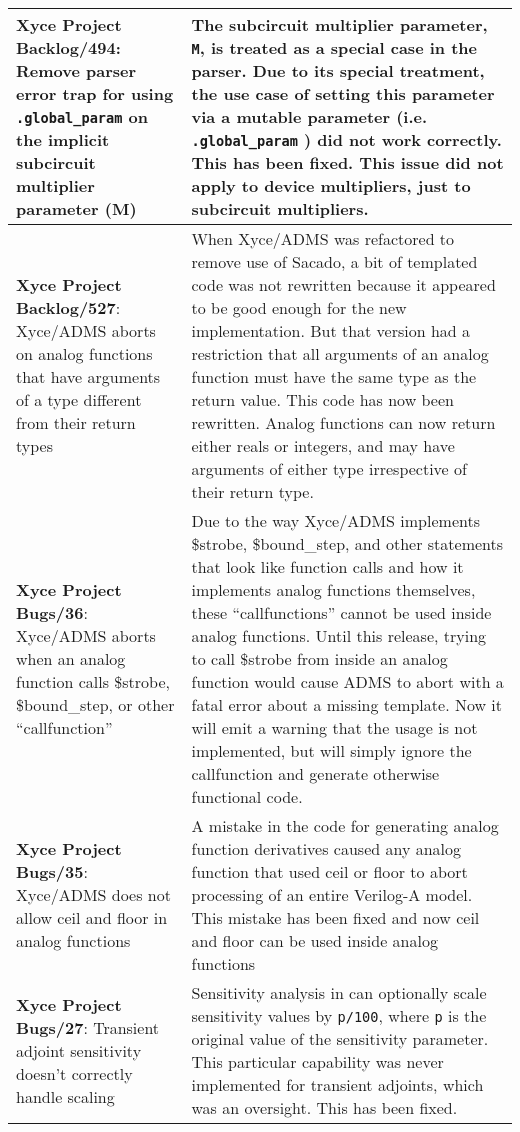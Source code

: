 {\begin{longtable}[h] {>{\raggedright\small}m{2in}|>{\raggedright\let\\\tabularnewline\small}m{3.5in}}
  \textbf{Xyce Project Backlog/494}: Remove parser error trap for
  using \texttt{.global\_param} on the implicit subcircuit multiplier
  parameter (M) & The subcircuit multiplier parameter, \texttt{M}, is
  treated as a special case in the \Xyce{} parser.  Due to its special
  treatment, the use case of setting this parameter via a mutable
  parameter (i.e.  \texttt{.global\_param} ) did not work correctly.
  This has been fixed. This issue did not apply to device multipliers,
  just to subcircuit multipliers.  \\ \hline

  \textbf{Xyce Project Backlog/527}: Xyce/ADMS aborts on analog
  functions that have arguments of a type different from their return
  types & When Xyce/ADMS was refactored to remove use of Sacado, a bit
  of templated code was not rewritten because it appeared to be good
  enough for the new implementation.  But that version had a
  restriction that all arguments of an analog function must have the
  same type as the return value.  This code has now been
  rewritten. Analog functions can now return either reals or integers,
  and may have arguments of either type irrespective of their return
  type.  \\ \hline

  \textbf{Xyce Project Bugs/36}: Xyce/ADMS aborts when an analog
  function calls \$strobe, \$bound\_step, or other ``callfunction'' &
  Due to the way Xyce/ADMS implements \$strobe, \$bound\_step, and
  other statements that look like function calls and how it implements
  analog functions themselves, these ``callfunctions'' cannot be used
  inside analog functions.  Until this release, trying to
  call \$strobe from inside an analog function would cause ADMS to
  abort with a fatal error about a missing template.  Now it will emit
  a warning that the usage is not implemented, but will simply ignore
  the callfunction and generate otherwise functional code. \\ \hline

  \textbf{Xyce Project Bugs/35}: Xyce/ADMS does not allow ceil and
  floor in analog functions & A mistake in the code for generating
  analog function derivatives caused any analog function that used
  ceil or floor to abort processing of an entire Verilog-A model.
  This mistake has been fixed and now ceil and floor can be used
  inside analog functions \\ \hline

  \textbf{Xyce Project Bugs/27}: Transient adjoint sensitivity doesn't
  correctly handle scaling & Sensitivity analysis in \Xyce{} can
  optionally scale sensitivity values by \texttt{p/100},
  where \texttt{p} is the original value of the sensitivity parameter.
  This particular capability was never implemented for transient
  adjoints, which was an oversight.  This has been fixed.  \\ \hline

\end{longtable}
}
